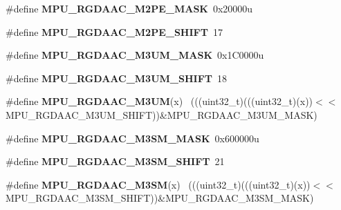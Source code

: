 \begin{DoxyCompactItemize}
\item 
\hypertarget{group___m_p_u___register___masks_ga6874e60f0d77ebd63d294605ff99f240}{}\#define {\bfseries M\+P\+U\+\_\+\+R\+G\+D\+A\+A\+C\+\_\+\+M2\+P\+E\+\_\+\+M\+A\+S\+K}~0x20000u\label{group___m_p_u___register___masks_ga6874e60f0d77ebd63d294605ff99f240}

\item 
\hypertarget{group___m_p_u___register___masks_gaaf75f6361f7eb3bc6210018bd8c99468}{}\#define {\bfseries M\+P\+U\+\_\+\+R\+G\+D\+A\+A\+C\+\_\+\+M2\+P\+E\+\_\+\+S\+H\+I\+F\+T}~17\label{group___m_p_u___register___masks_gaaf75f6361f7eb3bc6210018bd8c99468}

\item 
\hypertarget{group___m_p_u___register___masks_gaf2452a83e10e064460faa1161376e227}{}\#define {\bfseries M\+P\+U\+\_\+\+R\+G\+D\+A\+A\+C\+\_\+\+M3\+U\+M\+\_\+\+M\+A\+S\+K}~0x1\+C0000u\label{group___m_p_u___register___masks_gaf2452a83e10e064460faa1161376e227}

\item 
\hypertarget{group___m_p_u___register___masks_gac64ad669637020d4ed932759c5018a1a}{}\#define {\bfseries M\+P\+U\+\_\+\+R\+G\+D\+A\+A\+C\+\_\+\+M3\+U\+M\+\_\+\+S\+H\+I\+F\+T}~18\label{group___m_p_u___register___masks_gac64ad669637020d4ed932759c5018a1a}

\item 
\hypertarget{group___m_p_u___register___masks_gac7dd7fa0732590802f8e632cc491834b}{}\#define {\bfseries M\+P\+U\+\_\+\+R\+G\+D\+A\+A\+C\+\_\+\+M3\+U\+M}(x)                                          ~(((uint32\+\_\+t)(((uint32\+\_\+t)(x))$<$$<$M\+P\+U\+\_\+\+R\+G\+D\+A\+A\+C\+\_\+\+M3\+U\+M\+\_\+\+S\+H\+I\+F\+T))\&M\+P\+U\+\_\+\+R\+G\+D\+A\+A\+C\+\_\+\+M3\+U\+M\+\_\+\+M\+A\+S\+K)\label{group___m_p_u___register___masks_gac7dd7fa0732590802f8e632cc491834b}

\item 
\hypertarget{group___m_p_u___register___masks_gae5e6d54ab5d669ec57740a22ea1a9840}{}\#define {\bfseries M\+P\+U\+\_\+\+R\+G\+D\+A\+A\+C\+\_\+\+M3\+S\+M\+\_\+\+M\+A\+S\+K}~0x600000u\label{group___m_p_u___register___masks_gae5e6d54ab5d669ec57740a22ea1a9840}

\item 
\hypertarget{group___m_p_u___register___masks_ga2100b16ac6437948090913ee54184df6}{}\#define {\bfseries M\+P\+U\+\_\+\+R\+G\+D\+A\+A\+C\+\_\+\+M3\+S\+M\+\_\+\+S\+H\+I\+F\+T}~21\label{group___m_p_u___register___masks_ga2100b16ac6437948090913ee54184df6}

\item 
\hypertarget{group___m_p_u___register___masks_ga666481f8dfe05dff0c698b5725723cea}{}\#define {\bfseries M\+P\+U\+\_\+\+R\+G\+D\+A\+A\+C\+\_\+\+M3\+S\+M}(x)                                          ~(((uint32\+\_\+t)(((uint32\+\_\+t)(x))$<$$<$M\+P\+U\+\_\+\+R\+G\+D\+A\+A\+C\+\_\+\+M3\+S\+M\+\_\+\+S\+H\+I\+F\+T))\&M\+P\+U\+\_\+\+R\+G\+D\+A\+A\+C\+\_\+\+M3\+S\+M\+\_\+\+M\+A\+S\+K)\label{group___m_p_u___register___masks_ga666481f8dfe05dff0c698b5725723cea}


\end{DoxyCompactItemize}
